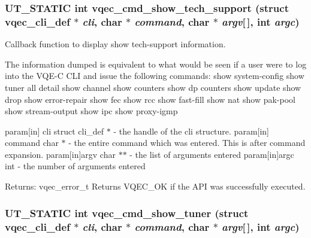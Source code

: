 \subsubsection{\setlength{\rightskip}{0pt plus 5cm}UT\_\-STATIC int vqec\_\-cmd\_\-show\_\-tech\_\-support (struct \bf{vqec\_\-cli\_\-def} $\ast$ {\em cli}, char $\ast$ {\em command}, char $\ast$ {\em argv}[$\,$], int {\em argc})}\label{vqec__cli__register_8c_c3167d28aa0c88496811c0bdea997b28}


Callback function to display show tech-support information.

The information dumped is equivalent to what would be seen if a user were to log into the VQE-C CLI and issue the following commands: show system-config show tuner all detail show channel show counters show dp counters show update show drop show error-repair show fec show rcc show fast-fill show nat show pak-pool show stream-output show ipc show proxy-igmp

param[in] cli struct cli\_\-def $\ast$ - the handle of the cli structure. param[in] command char $\ast$ - the entire command which was entered. This is after command expansion. param[in]argv char $\ast$$\ast$ - the list of arguments entered param[in]argc int - the number of arguments entered \begin{Desc}
\item[Returns:]vqec\_\-error\_\-t Returns VQEC\_\-OK if the API was successfully executed. \end{Desc}
\subsubsection{\setlength{\rightskip}{0pt plus 5cm}UT\_\-STATIC int vqec\_\-cmd\_\-show\_\-tuner (struct \bf{vqec\_\-cli\_\-def} $\ast$ {\em cli}, char $\ast$ {\em command}, char $\ast$ {\em argv}[$\,$], int {\em argc})}\label{vqec__cli__register_8c_c10705a0d5db25da20474614f02c161e}


